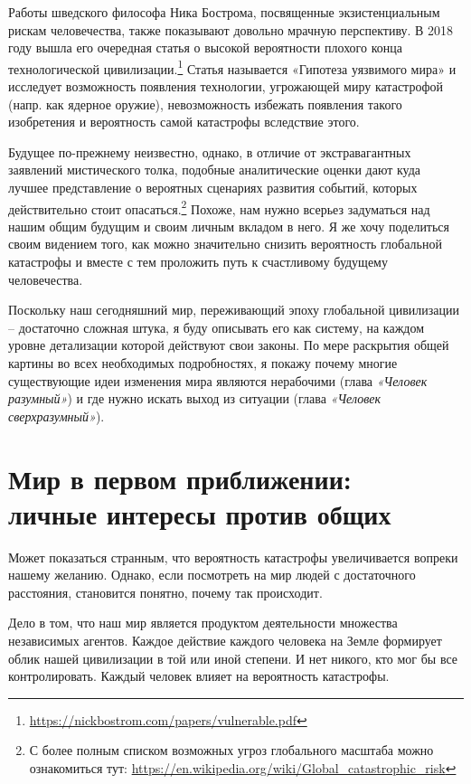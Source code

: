 \documentclass[12pt,a4paper]{report}
\begin{document}
\noindent Работы шведского философа Ника Бострома, посвященные экзистенциальным рискам человечества, также показывают довольно мрачную перспективу. В 2018 году вышла его очередная статья о высокой вероятности плохого конца технологической цивилизации.\footnote{\url{https://nickbostrom.com/papers/vulnerable.pdf}} Статья называется «Гипотеза уязвимого мира» и исследует возможность появления технологии, угрожающей миру катастрофой (напр. как ядерное оружие), невозможность избежать появления такого изобретения и вероятность самой катастрофы вследствие этого.

\noindent Будущее по-прежнему неизвестно, однако, в отличие от экстравагантных заявлений мистического толка, подобные аналитические оценки дают куда лучшее представление о вероятных сценариях развития событий, которых действительно стоит опасаться.\footnote{С более полным списком возможных угроз глобального масштаба можно ознакомиться тут: \url{https://en.wikipedia.org/wiki/Global_catastrophic_risk}} Похоже, нам нужно всерьез задуматься над нашим общим будущим и своим личным вкладом в него. Я же хочу поделиться своим видением того, как можно значительно снизить вероятность глобальной катастрофы и вместе с тем проложить путь к счастливому будущему человечества.

\noindent Поскольку наш сегодняшний мир, переживающий эпоху глобальной цивилизации -- достаточно сложная штука, я буду описывать его как систему, на каждом уровне детализации которой действуют свои законы. По мере раскрытия общей картины во всех необходимых подробностях, я покажу почему многие существующие идеи изменения мира являются нерабочими (глава \emph{«Человек разумный»}) и где нужно искать выход из ситуации (глава \emph{«Человек сверхразумный»}).

\section*{Мир в первом приближении:\\личные интересы против общих}

Может показаться странным, что вероятность катастрофы увеличивается вопреки нашему желанию. Однако, если посмотреть на мир людей с достаточного расстояния, становится понятно, почему так происходит.

\noindent Дело в том, что наш мир является продуктом деятельности множества независимых агентов. Каждое действие каждого человека на Земле формирует облик нашей цивилизации в той или иной степени. И нет никого, кто мог бы все контролировать. Каждый человек влияет на вероятность катастрофы.
\end{document}
